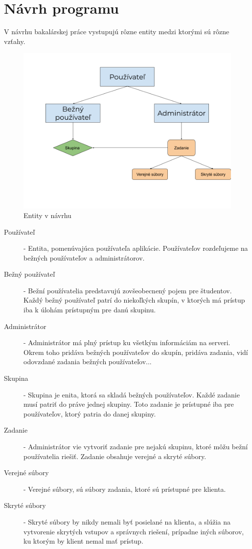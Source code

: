 \chapter{Návrh programu}

\label{kap:design} %

V návrhu bakalárskej práce vystupujú rôzne entity medzi ktorými sú rôzne vzťahy. 
\begin{figure}[H]
\centerline{\includegraphics[width=1\textwidth]{images/entity}}
\caption[Entity v návrhu]{Entity v návrhu}
\label{obr:entity}
\end{figure}

\begin{description}
\item [Používateľ] - Entita, pomenúvajúca používateľa aplikácie. Používateľov rozdeľujeme na 
bežných používateľov a administrátorov.
\item [Bežný používateľ] - Bežní používatelia predstavujú zovšeobecnený pojem pre študentov. Každý
bežný používateľ patrí do niekoľkých skupín, v ktorých má prístup iba k úlohám prístupným pre danú
skupinu.
\item [Administrátor] - Administrátor má plný prístup ku všetkým informáciám na serveri. Okrem
toho pridáva bežných používateľov do skupín, pridáva zadania, vidí odovzdané zadania bežných
používateľov...
\item [Skupina] - Skupina je enita, ktorá sa skladá bežných používateľov. Každé zadanie musí
patriť do práve jednej skupiny. Toto zadanie je prístupné iba pre používateľov, ktorý patria do
danej skupiny. 
\item [Zadanie] - Administrátor vie vytvoriť zadanie pre nejakú skupinu, ktoré môžu bežní
používatelia riešiť. Zadanie obsahuje verejné a skryté súbory.
\item [Verejné súbory] - Verejné súbory, sú súbory zadania, ktoré sú prístupné pre klienta.
\item [Skryté súbory] - Skryté súbory by nikdy nemali byť posielané na klienta, a slúžia na 
vytvorenie skrytých vstupov a správnych riešení, prípadne iných súborov, ku ktorým by klient
nemal mať prístup.
\end{description}


